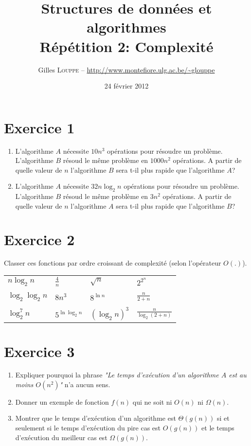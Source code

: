 \documentclass[a4paper,10pt]{article}
\title{
    \textbf{Structures de données et algorithmes}\\
    Répétition 2: Complexité
}
\author{Gilles \textsc{Louppe} -- \url{http://www.montefiore.ulg.ac.be/~glouppe}}
\date{24 février 2012}
\begin{document}
\maketitle

\section*{Exercice 1}

\begin{enumerate}

\item L'algorithme $A$ nécessite $10n^3$ opérations pour résoudre un problème.
L'algorithme $B$ résoud le même problème en $1000n^2$ opérations. A partir de
quelle valeur de $n$ l'algorithme $B$ sera t-il plus rapide que l'algorithme
$A$?

\item L'algorithme $A$ nécessite $32n \log_2 n$ opérations pour résoudre un
problème.  L'algorithme $B$ résoud le même problème en $3n^2$ opérations. A
partir de quelle valeur de $n$  l'algorithme $A$ sera t-il plus rapide que
l'algorithme $B$?

\end{enumerate}

\section*{Exercice 2}

Classer ces fonctions par ordre croissant de complexité (selon l'opérateur
$O(.)$).

\begin{center}
\begin{tabular}{llll}
    $n \log_2 n$ & $\frac{4}{n}$ & $\sqrt{n}$ & $2^{2^n}$ \\\\
    $\log_2 \log_2 n$ & $8n^3$ & $8^{\ln n}$ & $\frac{n}{2+n}$ \\\\
    $\log_2^7 n$ & $5^{\ln \log_2 n}$ & $(\log_2 n)^3$ & $\frac{n}{\log_2 (2+n)}$
\end{tabular}
\end{center}

\section*{Exercice 3}

\begin{enumerate}

\item Expliquer pourquoi la phrase \textit{"Le temps d'exécution d'un algorithme $A$ est au moins $O(n^2)$"} n'a aucun sens.

\item Donner un exemple de fonction $f(n)$ qui ne soit ni $O(n)$ ni $\Omega(n)$.

\item Montrer que le temps d'exécution d'un algorithme est $\Theta(g(n))$ si et seulement si le temps d'exécution du pire cas est $O(g(n))$ et le temps d'exécution du meilleur cas est $\Omega(g(n))$.

\end{enumerate}
\end{document}
